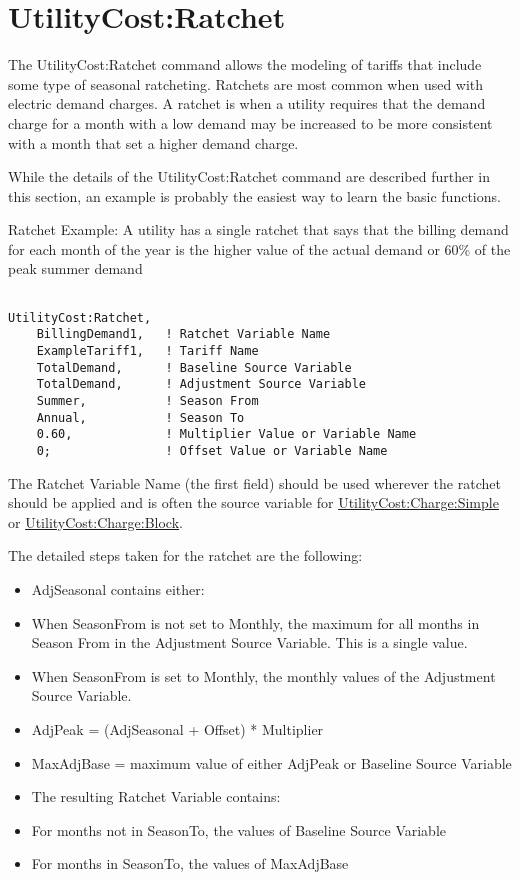 \section{UtilityCost:Ratchet}\label{utilitycostratchet}

The UtilityCost:Ratchet command allows the modeling of tariffs that include some type of seasonal ratcheting. Ratchets are most common when used with electric demand charges. A ratchet is when a utility requires that the demand charge for a month with a low demand may be increased to be more consistent with a month that set a higher demand charge.

While the details of the UtilityCost:Ratchet command are described further in this section, an example is probably the easiest way to learn the basic functions.

Ratchet Example: A utility has a single ratchet that says that the billing demand for each month of the year is the higher value of the actual demand or 60\% of the peak summer demand

\begin{lstlisting}

UtilityCost:Ratchet,
    BillingDemand1,   ! Ratchet Variable Name
    ExampleTariff1,   ! Tariff Name
    TotalDemand,      ! Baseline Source Variable
    TotalDemand,      ! Adjustment Source Variable
    Summer,           ! Season From
    Annual,           ! Season To
    0.60,             ! Multiplier Value or Variable Name
    0;                ! Offset Value or Variable Name
\end{lstlisting}

The Ratchet Variable Name (the first field) should be used wherever the ratchet should be applied and is often the source variable for \hyperref[utilitycostchargesimple]{UtilityCost:Charge:Simple} or \hyperref[utilitycostchargeblock]{UtilityCost:Charge:Block}.

The detailed steps taken for the ratchet are the following:

\begin{itemize}
\item
  AdjSeasonal contains either:
\item
  When SeasonFrom is not set to Monthly, the maximum for all months in Season From in the Adjustment Source Variable. This is a single value.
\item
  When SeasonFrom is set to Monthly, the monthly values of the Adjustment Source Variable.
\item
  AdjPeak = (AdjSeasonal + Offset) * Multiplier
\item
  MaxAdjBase = maximum value of either AdjPeak or Baseline Source Variable
\item
  The resulting Ratchet Variable contains:
\item
  For months not in SeasonTo, the values of Baseline Source Variable
\item
  For months in SeasonTo, the values of MaxAdjBase
\end{itemize}

